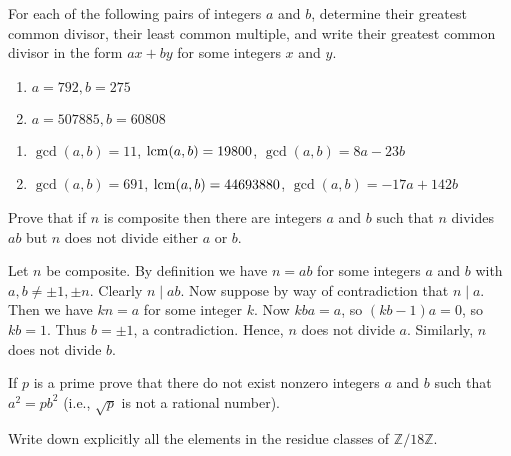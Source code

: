 \def\thetitle{Homework 1}



\begin{questions}

\question
  For each of the following pairs of integers \(a\) and \(b\), determine their greatest common divisor, their least common multiple, and write their greatest common divisor in the form \(a x+b y\) for some integers \(x\) and \(y\).
  \begin{enumerate}[label=(\alph*)]
    \item \(a=792, b=275\)
    \item \(a=507885, b=60808\)
  \end{enumerate} 

\begin{solution}
    \begin{enumerate}[label=(\alph*)]
        \item \(\gcd(a,b) = 11\), \(\operatorname{lcm}(a,b) = 19800\), \(\gcd(a,b)= 8a - 23b\)
        \item \(\gcd(a,b) = 691\), \(\operatorname{lcm}(a,b) = 44693880\), \(\gcd(a,b)= -17a +142b\)
    \end{enumerate}
\end{solution}


\question
    Prove that if \({n}\) is composite then there are integers \(a\) and \(b\) such that \(n\) divides \(a b\) but \(n\) does not divide either \(a\) or \(b\).

\begin{solution}
    Let \(n\) be composite. By definition we have \(n=a b\) for some integers \(a\) and \(b\) with \(a, b \neq \pm 1, \pm n\). Clearly \(n \mid a b\). Now suppose by way of contradiction that \(n \mid a\). Then we have \(k n=a\) for some integer \(k\). Now \(k b a=a\), so \((k b-1) a=0\), so \(k b=1\). Thus \(b= \pm 1\), a contradiction. Hence,  \(n\) does not divide \(a\). Similarly, \(n\) does not divide \(b\).
\end{solution}

\question
    If \(p\) is a prime prove that there do not exist nonzero integers \(a\) and \(b\) such that \(a^2=p b^2\) (i.e., \(\sqrt{p}\) is not a rational number).



\question
    Write down explicitly all the elements in the residue classes of \(\mathbb{Z} / 18 \mathbb{Z}\).




\begin{solution}
    

\end{solution}
\end{questions}
